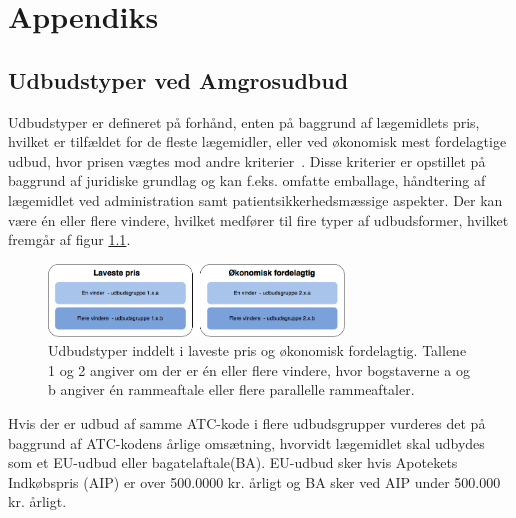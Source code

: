 \chapter{Appendiks} \label{cha:AppB}
\section{Udbudstyper ved Amgrosudbud}
Udbudstyper er defineret på forhånd, enten på baggrund af lægemidlets pris, hvilket er tilfældet for de fleste lægemidler, eller ved økonomisk mest fordelagtige udbud, hvor prisen vægtes mod andre kriterier~\citep{Amgros2018a}. Disse kriterier er opstillet på baggrund af juridiske grundlag og kan f.eks. omfatte emballage, håndtering af lægemidlet ved administration samt patientsikkerhedsmæssige aspekter. Der kan være én eller flere vindere, hvilket medfører til fire typer af udbudsformer, hvilket fremgår af figur \ref{fig:TypeUdbud}.~\citep{Amgros2018a}

\begin{figure}[H]\centering
	\includegraphics[width=0.7\textwidth]{billeder/TypeUdbud.png} 
	\caption{Udbudstyper inddelt i laveste pris og økonomisk fordelagtig. Tallene 1 og 2 angiver om der er én eller flere vindere, hvor bogstaverne a og b angiver én rammeaftale eller flere parallelle rammeaftaler. ~\citep{Amgros2018a}}
	\label{fig:TypeUdbud}  
\end{figure}

Hvis der er udbud af samme ATC-kode i flere udbudsgrupper vurderes det på baggrund af ATC-kodens årlige omsætning, hvorvidt lægemidlet  skal udbydes som et EU-udbud eller bagatelaftale(BA). EU-udbud sker hvis Apotekets Indkøbspris (AIP) er over 500.0000 kr. årligt og BA sker ved AIP under 500.000 kr. årligt. 

